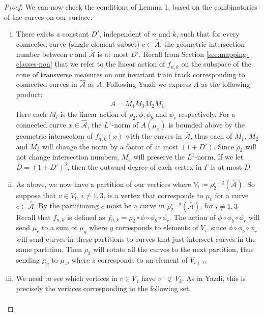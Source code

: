 \begin{proof}
We can now check the conditions of Lemma 1, based on the combinatorics of the curves on our surface:
\begin{enumerate}[(i)]
\item There exists a constant $D'$, independent of $n$ and
  $k$, such that for every connected curve (single element subset) $c \subset \hat{A}$, the geometric
  intersection number between $c$ and $\overline{\mathcal{A}}$ is at most $D'$. Recall from Section
  \ref{sec:mapping-classes-non} that we refer to the linear action of $f_{n,k}$ on the subspace of the cone of
  transverse measures on our invariant train track corresponding to connected curves in $\hat{\mathcal{A}}$ as
  $A$. Following Yazdi we express $A$ as the following product:
  \begin{align*}
    A = M_4M_3M_2M_1.
  \end{align*}
  Here each $M_i$ is the linear action of $\rho_2,\phi,\phi_b$ and $\phi_r$ respectively. For a connected
  curve $x \in \hat{\mathcal{A}}$, the $L^1$-norm of $A(\mu_x)$ is bounded above by the geometric intersection of
  $f_{n,k}(x)$ with the curves in $\overline{\mathcal{A}}$, thus each of $M_1$, $M_2$ and $M_3$ will change the norm by
  a factor of at most $(1 + D')$. Since $\rho_2$ will not change intersection numbers, $M_4$ will preserve the
  $L^1$-norm. If we let $D = (1 + D')^3$, then the outward degree of each vertex in $\Gamma$ is at most $D$.
\item As above, we now have a partition of our vertices where
  $V_i \coloneqq \rho_2^{i-2}(\overline{\mathcal{A}})$. So suppose that $v \in V_i$, $i \neq 1,3$, is a vertex
  that corresponds to $\mu_c$ for a curve $c \in \hat{\mathcal{A}}$. By the partitioning $c$ must be a curve
  in $\rho_2^{i-2}(\overline{\mathcal{A}})$, for $i \neq 1,3$. Recall that $f_{n,k}$ is defined as
  $f_{n,k} = \rho_2 \circ \phi \circ \phi_b \circ \phi_r$. The action of $\phi \circ \phi_b \circ \phi_r$ will
  send $\mu_c$ to a sum of $\mu_y$ where $y$ corresponds to elements of $V_i$, since
  $\phi \circ \phi_b \circ \phi_r$ will send curves in these partitions to curves that just intersect curves
  in the same partition. Then $\rho_2$ will rotate all the curves to the next partition, thus sending $\mu_y$
  to $\mu_z$, where $z$ corresponds to an element of $V_{i+1}$.
\item We need to see which vertices in $v \in V_1$ have $v^+ \not\subset V_2$. As in Yazdi, this is precisely
  the vertices corresponding to the following set.
  \begin{align*}

\end{align*}
\end{enumerate}
\end{proof}
